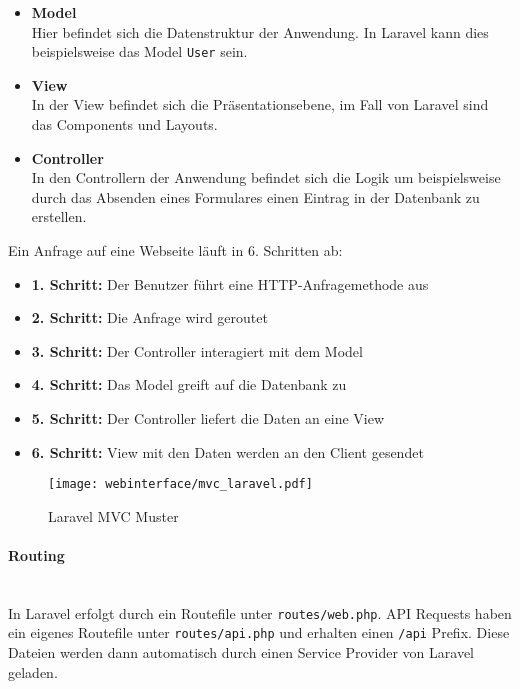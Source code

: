 \begin{itemize}
  \item \textbf{Model} \\
  Hier befindet sich die Datenstruktur der Anwendung. In Laravel kann dies
  beispielsweise das Model \verb|User| sein.
  \item \textbf{View} \\
  In der View befindet sich die Präsentationsebene, im Fall von Laravel sind das
  Components und Layouts.
  \item \textbf{Controller} \\
  In den Controllern der Anwendung befindet sich die Logik um beispielsweise
  durch das Absenden eines Formulares einen Eintrag in der Datenbank zu
  erstellen. 
\end{itemize}

Ein Anfrage auf eine Webseite läuft in 6. Schritten ab:

\begin{itemize}
  \item \textbf{1. Schritt:} Der Benutzer führt eine HTTP-Anfragemethode aus
  \item \textbf{2. Schritt:} Die Anfrage wird geroutet
  \item \textbf{3. Schritt:} Der Controller interagiert mit dem Model
  \item \textbf{4. Schritt:} Das Model greift auf die Datenbank zu
  \item \textbf{5. Schritt:} Der Controller liefert die Daten an eine View
  \item \textbf{6. Schritt:} View mit den Daten werden an den Client gesendet
\end{itemize}

\begin{figure}[H]
  \centering
  \texttt{[image: webinterface/mvc\_laravel.pdf]}
  \caption{Laravel MVC Muster}
\end{figure}

\paragraph{Routing}\mbox{}\\
In Laravel erfolgt durch ein Routefile unter \verb|routes/web.php|. API Requests
haben ein eigenes Routefile unter \verb|routes/api.php| und erhalten einen
\verb|/api| Prefix. Diese Dateien werden dann automatisch durch einen Service
Provider von Laravel geladen.\\

